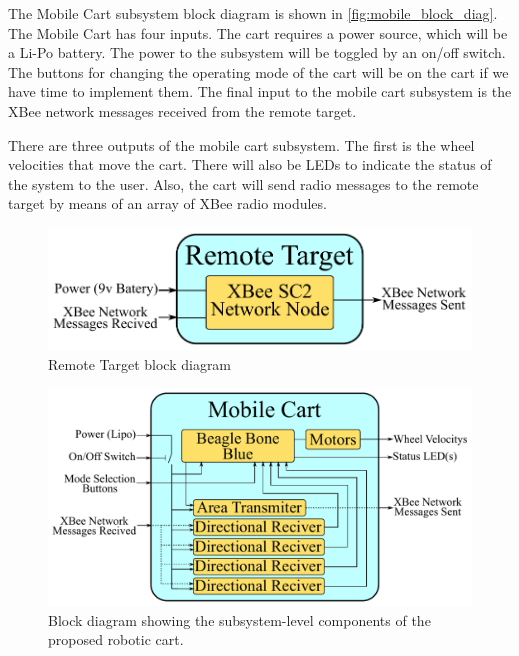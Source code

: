 \documentclass[letterpaper,12pt]{article}   %
\begin{document}
\vspace*{12pt}
\noindent
The Mobile Cart subsystem block diagram is shown in
\autoref{fig:mobile_block_diag}. The Mobile Cart has four inputs. The cart
requires a power source, which will be a Li-Po battery. The power to the
subsystem will be toggled by an on/off switch. The buttons for changing the
operating mode of the cart will be on the cart if we have time to implement
them. The final input to the mobile cart subsystem is the XBee network messages
received from the remote target.

\vspace*{12pt}
\noindent

There are three outputs of the mobile cart subsystem. The first is the wheel
velocities that move the cart. There will also be LEDs to indicate the status of
the system to the user. Also, the cart will send radio messages to the remote
target by means of an array of XBee radio modules. %
%
\begin{figure}[h!]
  \centering
  \includegraphics[scale=0.9]{figs/remote_target_block_diagram}
  \caption{Remote Target block diagram}
  \label{fig:remote_block_diag}
\end{figure}

\begin{figure}[h!]
  \centering
  \includegraphics[scale=0.82]{figs/mobile_cart_block_diagram}
  \caption{Block diagram showing the subsystem-level components of the proposed robotic cart.}
  \label{fig:mobile_block_diag}
\end{figure}
\end{document}
